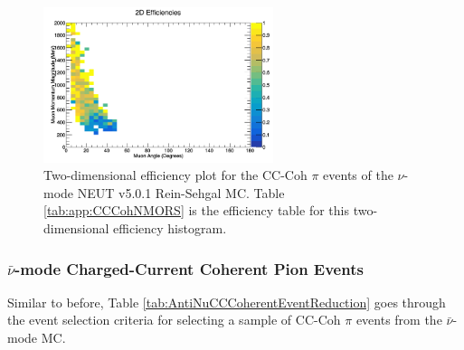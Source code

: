 \documentclass[11pt]{article}
\begin{document}
\begin{figure}[H]
\centering
\includegraphics[width=0.6\textwidth]{CCCohPlots/2DEffNMORS.png}
\caption{Two-dimensional efficiency plot for the CC-Coh $\pi$ events of the $\nu$-mode NEUT v5.0.1 Rein-Sehgal MC. Table \ref*{tab:app:CCCohNMORS} is the efficiency table for this two-dimensional efficiency histogram.}
\label{fig:TwoDEfficiencyCCCohNMORS}
\end{figure}

\subsubsection{$\bar{\nu}$-mode Charged-Current Coherent Pion Events}
\label{subsub:AntiNuModeCCCohPion}

Similar to before, Table \ref{tab:AntiNuCCCoherentEventReduction} goes through the event selection criteria for selecting a sample of CC-Coh $\pi$ events from the $\bar{\nu}$-mode MC.
\end{document}
